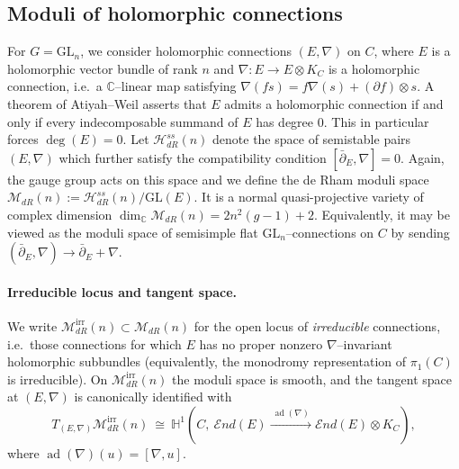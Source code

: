 \documentclass[twoside, 11pt]{article}
\numberwithin{equation}{section}
\theoremstyle{theorem}
\numberwithin{theorem}{section}
\theoremstyle{definition}
\newcommand{\pa}{\partial}
\begin{document}
%
\subsection{Moduli of holomorphic connections}
\label{s:moduli-hol-conn}

For $G=\mathrm{GL}_n$, we consider holomorphic connections $(E,\nabla)$ on $C$, where $E$ is a holomorphic vector bundle of rank $n$ and
\(\nabla:E\to E\otimes K_C\)
is a holomorphic connection, i.e.\ a $\mathbb{C}$--linear map satisfying $\nabla(fs)=f\nabla(s)+(\partial f)\otimes s$. A theorem of Atiyah--Weil asserts that $E$ admits a holomorphic connection if and only if every indecomposable summand of $E$ has degree $0$. This in particular forces $\deg(E) = 0$. 
Let $\mathcal H_{dR}^{ss}(n)$ denote the space of semistable pairs $(E,\nabla)$ which further satisfy the compatibility condition $[\bar\pa_E,\nabla]=0$. Again, the gauge group acts on this space and we define the de Rham moduli space $\mathcal{M}_{dR}(n):= \mathcal H_{dR}^{ss}(n)/\mathrm{GL}(E)$. It is a normal quasi-projective variety of complex dimension $\dim_{\mathbb{C}}\mathcal{M}_{dR}(n)=2n^2(g-1)+2$. Equivalently, it may be viewed as the moduli space of semisimple flat $\mathrm{GL}_n$--connections on $C$ by sending $(\bar\pa_E,\nabla) \to \bar\pa_E+\nabla$. 



\paragraph{Irreducible locus and tangent space.}
We write $\mathcal{M}_{dR}^{\mathrm{irr}}(n)\subset \mathcal{M}_{dR}(n)$ for the open locus of \emph{irreducible} connections, i.e.\ those connections for which $E$ has no proper nonzero $\nabla$--invariant holomorphic subbundles (equivalently, the monodromy representation of $\pi_1(C)$ is irreducible). On $\mathcal{M}_{dR}^{\mathrm{irr}}(n)$ the moduli space is smooth, and the tangent space at $(E,\nabla)$ is canonically identified with
\[
T_{(E,\nabla)}\mathcal{M}_{dR}^{\mathrm{irr}}(n)\ \cong\
\mathbb{H}^1\!\left(C,\ \mathcal{E}nd(E)\xrightarrow{\ \operatorname{ad}(\nabla)\ }\mathcal{E}nd(E)\otimes K_C\right),
\]
where $\operatorname{ad}(\nabla)(u)=[\nabla,u]$.
\end{document}
